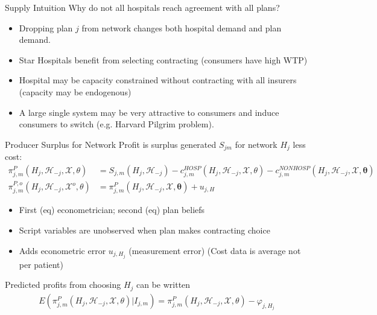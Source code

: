 \documentclass[aspectratio=169,10pt]{beamer}
\begin{document}
\begin{frame}{Supply Intuition}
Why do not all hospitals reach agreement with all plans?
\begin{itemize}
\item Dropping plan $j$ from network changes both hospital demand and plan demand.
 \item Star Hospitals benefit from selecting contracting (consumers have high WTP)
 \item Hospital may be capacity constrained without contracting with all insurers (capacity may be endogenous)
 \item A large single system may be very attractive to consumers and induce consumers to switch (e.g. Harvard Pilgrim problem).
 \end{itemize}
\end{frame}


\begin{frame}{Producer Surplus for Network}
Profit is surplus generated $S_{jm}$ for network $H_j$ less cost:
\begin{align*}
\pi_{j, m}^{P}\left(H_{j}, \mathcal{H}_{-j}, \mathcal{X}, \theta\right)&=S_{j, m}\left(H_{j}, \mathcal{H}_{-j}\right)-c_{j, m}^{H O S P}\left(H_{j}, \mathcal{H}_{-j}, \mathcal{X}, \theta\right)-c_{j, m}^{N O N H O S P}\left(H_{j}, \mathcal{H}_{-j}, \mathcal{X}, \symbf{\theta}\right) \\
\pi_{j, m}^{P, o}\left(H_{j}, \mathcal{H}_{-j}, \mathcal{X}^{o}, \theta\right)&=\pi_{j, m}^{P}\left(H_{j}, \mathcal{H}_{-j}, \mathcal{X}, \symbf{\theta}\right)+u_{j, H}
\end{align*}
\begin{itemize}
\item First (eq) econometrician; second (eq) plan beliefs
\item Script variables are unobserved when plan makes contracting choice
\item Adds econometric error $u_{j,H_j}$ (measurement error) (Cost data is average not per patient)
\end{itemize}
Predicted profits from choosing $H_j$ can be written
\begin{align*}
E\left(\pi_{j, m}^{P}\left(H_{j}, \mathcal{H}_{-j}, \mathcal{X}, \theta\right) | I_{j, m}\right)=\pi_{j, m}^{P}\left(H_{j}, \mathcal{H}_{-j}, \mathcal{X}, \theta\right)-\varphi_{j, H_{j}}
\end{align*}
\end{frame}
\end{document}
